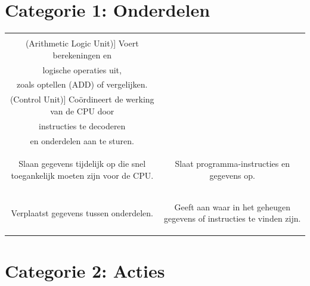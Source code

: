 \documentclass[a4paper,10pt]{article}
\begin{document}
\section*{Categorie 1: Onderdelen}

\begin{center}
\begin{tabular}{c@{\hskip 1cm}c}
  \begin{tcolorbox}[title=ALU \\ (Arithmetic Logic Unit)]
    Voert berekeningen en \\ logische operaties uit, \\ zoals optellen (ADD) of vergelijken.
  \end{tcolorbox} &
  \begin{tcolorbox}[title=CU \\ (Control Unit)]
    Coördineert de werking van de CPU door \\ instructies te decoderen \\ en onderdelen aan te sturen.
  \end{tcolorbox} \\[1cm]
  \begin{tcolorbox}[title=Registers]
    Slaan gegevens tijdelijk op die snel toegankelijk moeten zijn voor de CPU.
  \end{tcolorbox} &
  \begin{tcolorbox}[title=Geheugen (RAM)]
    Slaat programma-instructies en gegevens op.
  \end{tcolorbox} \\[1cm]
  \begin{tcolorbox}[title=Gegevensbus]
    Verplaatst gegevens tussen onderdelen.
  \end{tcolorbox} &
  \begin{tcolorbox}[title=Adresbus]
    Geeft aan waar in het geheugen gegevens of instructies te vinden zijn.
  \end{tcolorbox}
\end{tabular}
\end{center}

\newpage

\section*{Categorie 2: Acties}
\end{document}
